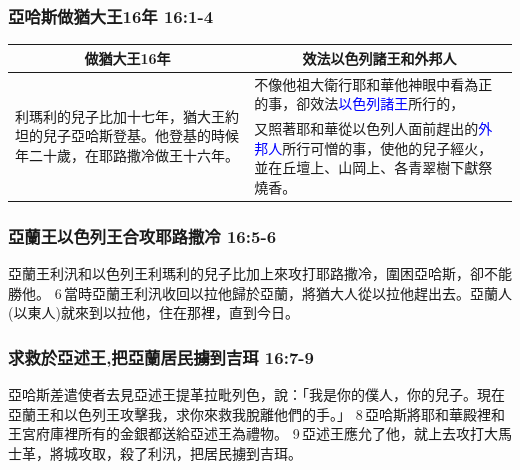 \subsubsection{亞哈斯做猶大王16年 16:1-4}
\begin{table}[H]
\hspace{-5mm}
\centering
\begin{tabular}{p{7.75cm}|p{9.5cm}}\hline
\multicolumn{1}{c|}{做猶大王16年}&\multicolumn{1}{c}{效法以色列諸王和外邦人}\\\hline
\multirow{2}{8.1cm}{利瑪利的兒子比加十七年，猶大王約坦的兒子亞哈斯登基。他登基的時候年二十歲，在耶路撒冷做王十六年。}&不像他祖大衛行耶和華他神眼中看為正的事，卻效法\textcolor{blue}{以色列諸王}所行的，\\\cline{2-2}
&又照著耶和華從以色列人面前趕出的\textcolor{blue}{外邦人}所行可憎的事，使他的兒子經火，並在丘壇上、山岡上、各青翠樹下獻祭燒香。\\\hline
\end{tabular}
\end{table}


\subsubsection{亞蘭王以色列王合攻耶路撒冷 16:5-6}
亞蘭王利汛和以色列王利瑪利的兒子比加上來攻打耶路撒冷，圍困亞哈斯，卻不能勝他。 6 當時亞蘭王利汛收回以拉他歸於亞蘭，將猶大人從以拉他趕出去。亞蘭人(以東人)就來到以拉他，住在那裡，直到今日。

\subsubsection{求救於亞述王,把亞蘭居民擄到吉珥 16:7-9}
亞哈斯差遣使者去見亞述王提革拉毗列色，說：「我是你的僕人，你的兒子。現在亞蘭王和以色列王攻擊我，求你來救我脫離他們的手。」 8 亞哈斯將耶和華殿裡和王宮府庫裡所有的金銀都送給亞述王為禮物。 9 亞述王應允了他，就上去攻打大馬士革，將城攻取，殺了利汛，把居民擄到吉珥。


